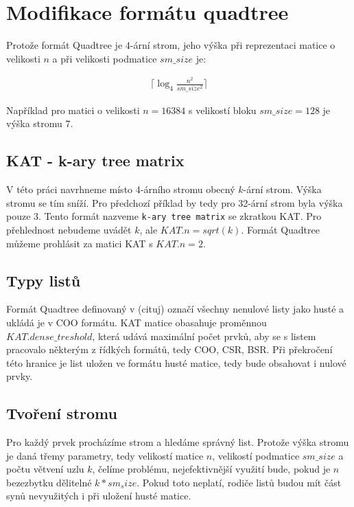 
\label{katchapter}
\chapter{Modifikace formátu quadtree}

Protože formát Quadtree je 4-ární strom, jeho výška při reprezentaci matice o velikosti $n$ a při velikosti podmatice $sm\_size$ je:

%

\label{quadtreeheight}
\begin{align}
\Bigg\lceil\log_{4}\frac{n^2}{sm\_size^2}\Bigg\rceil
\end{align}

Například pro matici o velikosti $n=16384$ s velikostí bloku $sm\_size=128$ je výška stromu $7$.

\section{KAT - k-ary tree matrix}

V této práci navrhneme místo 4-árního stromu obecný $k$-ární strom. Výška stromu se tím sníží. Pro předchozí příklad by tedy pro 32-ární strom byla výška pouze $3$. Tento formát nazveme \texttt{k-ary tree matrix} se zkratkou KAT. Pro přehlednost nebudeme uvádět $k$, ale $KAT.n = sqrt(k)$. Formát Quadtree můžeme prohlásit za matici KAT s $KAT.n = 2$.

\section{Typy listů}

Formát Quadtree definovaný v (cituj) označí všechny nenulové listy jako husté a ukládá je v COO formátu. KAT matice obasahuje proměnnou $KAT.dense\_treshold$, která udává maximální počet prvků, aby se s listem pracovalo některým z řídkých formátů, tedy COO, CSR, BSR. Při překročení této hranice je list uložen ve formátu husté matice, tedy bude obsahovat i nulové prvky.

\section{Tvoření stromu}

Pro každý prvek procházíme strom a hledáme správný list. Protože výška stromu je daná třemy parametry, tedy velikostí matice $n$, velikostí podmatice $sm\_size$ a počtu větvení uzlu $k$, čelíme problému, nejefektivnější využití bude, pokud je $n$ bezezbytku dělitelné $k * sm_size$. Pokud toto neplatí, rodiče listů budou mít část synů nevyužitých i při uložení husté matice.

